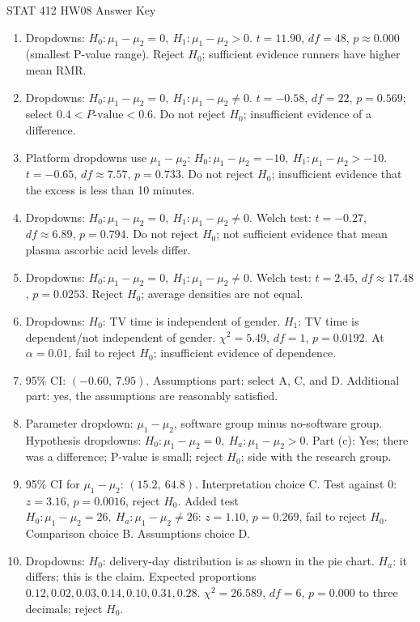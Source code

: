 \documentclass[11pt]{article}
\begin{document}
\raggedright

\begin{center}
{\Large STAT 412 HW08 Answer Key}
\end{center}

\begin{enumerate}[leftmargin=*]
\item Dropdowns: \(H_0:\mu_1-\mu_2=0,\ H_1:\mu_1-\mu_2>0\). \(t=11.90\), \(df=48\), \(p\approx0.000\) (smallest P-value range). Reject \(H_0\); sufficient evidence runners have higher mean RMR.
\item Dropdowns: \(H_0:\mu_1-\mu_2=0,\ H_1:\mu_1-\mu_2\ne0\). \(t=-0.58\), \(df=22\), \(p=0.569\); select \(0.4<P\text{-value}<0.6\). Do not reject \(H_0\); insufficient evidence of a difference.
\item Platform dropdowns use \(\mu_1-\mu_2\): \(H_0:\mu_1-\mu_2=-10,\ H_1:\mu_1-\mu_2>-10\). \(t=-0.65\), \(df\approx7.57\), \(p=0.733\). Do not reject \(H_0\); insufficient evidence that the excess is less than 10 minutes.
\item Dropdowns: \(H_0:\mu_1-\mu_2=0,\ H_1:\mu_1-\mu_2\ne0\). Welch test: \(t=-0.27\), \(df\approx6.89\), \(p=0.794\). Do not reject \(H_0\); not sufficient evidence that mean plasma ascorbic acid levels differ.
\item Dropdowns: \(H_0:\mu_1-\mu_2=0,\ H_1:\mu_1-\mu_2\ne0\). Welch test: \(t=2.45\), \(df\approx17.48\), \(p=0.0253\). Reject \(H_0\); average densities are not equal.
\item Dropdowns: \(H_0\): TV time is independent of gender. \(H_1\): TV time is dependent/not independent of gender. \(\chi^2=5.49\), \(df=1\), \(p=0.0192\). At \(\alpha=0.01\), fail to reject \(H_0\); insufficient evidence of dependence.
\item 95\% CI: \((-0.60,\ 7.95)\). Assumptions part: select A, C, and D. Additional part: yes, the assumptions are reasonably satisfied.
\item Parameter dropdown: \(\mu_1-\mu_2\), software group minus no-software group. Hypothesis dropdowns: \(H_0:\mu_1-\mu_2=0,\ H_a:\mu_1-\mu_2>0\). Part (c): Yes; there was a difference; P-value is small; reject \(H_0\); side with the research group.
\item 95\% CI for \(\mu_1-\mu_2\): \((15.2,\ 64.8)\). Interpretation choice C. Test against 0: \(z=3.16\), \(p=0.0016\), reject \(H_0\). Added test \(H_0:\mu_1-\mu_2=26,\ H_a:\mu_1-\mu_2\ne26\): \(z=1.10\), \(p=0.269\), fail to reject \(H_0\). Comparison choice B. Assumptions choice D.
\item Dropdowns: \(H_0\): delivery-day distribution is as shown in the pie chart. \(H_a\): it differs; this is the claim. Expected proportions \(0.12,0.02,0.03,0.14,0.10,0.31,0.28\). \(\chi^2=26.589\), \(df=6\), \(p=0.000\) to three decimals; reject \(H_0\).

\end{enumerate}
\end{document}
